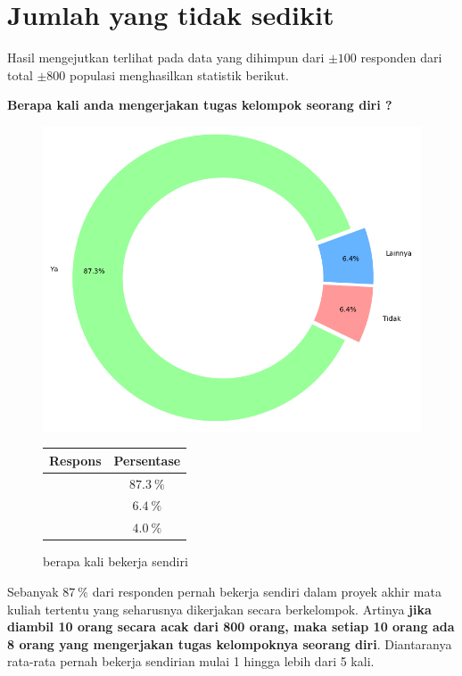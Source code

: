 \documentclass[a4paper,11pt]{article}
\begin{document}
\section{Jumlah yang tidak sedikit}
\label{sec:statistic}

Hasil mengejutkan terlihat pada data yang dihimpun dari $\pm 100$
responden dari total $\pm 800$ populasi menghasilkan statistik berikut.

\begin{center}
  \textbf{\small Berapa kali anda mengerjakan tugas kelompok seorang diri ?}
\end{center}

\begin{figure}[!ht]
  \centering
  \includegraphics[width=.4\linewidth]{img/kerja-sendiri-1.png}
  \qquad
  \begin{tabular}[b]{cc}\hline
    Respons & Persentase \\ \hline
    \color{green-1}{Ya} & $\SI{87.3}{\percent}$ \\
    \color{red-1}{Tidak} & $\SI{6.4}{\percent}$  \\
    \color{blue-1}{Lainnya} & $\SI{4.0}{\percent}$ \\ \hline
  \end{tabular}
  \captionsetup{labelformat=andtable}
    \caption{berapa kali bekerja sendiri}
\end{figure}

Sebanyak $\SI{87}{\percent}$ dari responden pernah bekerja sendiri
dalam proyek akhir mata kuliah tertentu yang seharusnya dikerjakan
secara berkelompok. Artinya \textbf{jika diambil 10 orang secara acak
dari 800 orang, maka setiap 10 orang ada 8 orang yang mengerjakan
tugas kelompoknya seorang diri}. Diantaranya rata-rata pernah bekerja
sendirian mulai 1 hingga lebih dari 5 kali.
\end{document}
